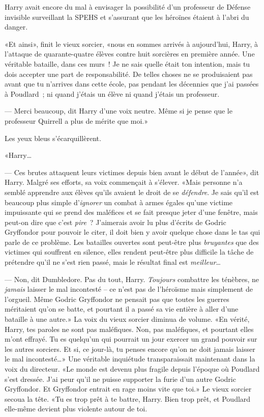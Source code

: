 Harry avait encore du mal à envisager la possibilité d'un professeur de Défense invisible surveillant la SPEHS et s'assurant que les héroïnes étaient à l'abri du danger.

«Et ainsi», finit le vieux sorcier, «nous en sommes arrivés à aujourd'hui, Harry, à l'attaque de quarante-quatre élèves contre huit sorcières en première année. Une véritable bataille, dans ces murs~! Je ne sais quelle était ton intention, mais tu dois accepter une part de responsabilité. De telles choses ne se produisaient pas avant que tu n'arrives dans cette école, pas pendant les décennies que j'ai passées à Poudlard~; ni quand j'étais un élève ni quand j'étais un professeur.

--- Merci beaucoup, dit Harry d'une voix neutre. Même si je pense que le professeur Quirrell a plus de mérite que moi.»

Les yeux bleus s'écarquillèrent.

«Harry…

--- Ces brutes attaquent leurs victimes depuis bien avant le début de l'année», dit Harry. Malgré ses efforts, sa voix commençait à s'élever. «Mais personne n'a semblé apprendre aux élèves qu'ils avaient le droit de se \emph{défendre}. Je sais qu'il est beaucoup plus simple d'\emph{ignorer} un combat à armes égales qu'une victime impuissante qui se prend des maléfices et se fait presque jeter d'une fenêtre, mais peut-on dire que c'est \emph{pire}~? J'aimerais avoir lu plus d'écrits de Godric Gryffondor pour pouvoir le citer, il doit bien y avoir quelque chose dans le tas qui parle de ce problème. Les batailles ouvertes sont peut-être plus \emph{bruyantes} que des victimes qui souffrent en silence, elles rendent peut-être plus difficile la tâche de prétendre qu'il ne s'est rien passé, mais le résultat final est \emph{meilleur}…

--- Non, dit Dumbledore. Pas du tout, Harry. \emph{Toujours} combattre les ténèbres, ne \emph{jamais} laisser le mal incontesté -- ce n'est pas de l'héroïsme mais simplement de l'orgueil. Même Godric Gryffondor ne pensait pas que toutes les guerres méritaient qu'on se batte, et pourtant il a passé sa vie entière à aller d'une bataille à une autre.» La voix du vieux sorcier diminua de volume. «En vérité, Harry, tes paroles ne sont pas maléfiques. Non, pas maléfiques, et pourtant elles m'ont effrayé. Tu es quelqu'un qui pourrait un jour exercer un grand pouvoir sur les autres sorciers. Et si, ce jour-là, tu penses encore qu'on ne doit jamais laisser le mal incontesté…» Une véritable inquiétude transparaissait maintenant dans la voix du directeur. «Le monde est devenu plus fragile depuis l'époque où Poudlard s'est dressée. J'ai peur qu'il ne puisse supporter la furie d'un autre Godric Gryffondor. Et Gryffondor entrait en rage moins vite que toi.» Le vieux sorcier secoua la tête. «Tu es trop prêt à te battre, Harry. Bien trop prêt, et Poudlard elle-même devient plus violente autour de toi.

